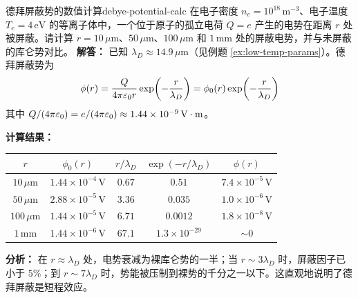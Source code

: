 \begin{example}{德拜屏蔽势的数值计算}{debye-potential-calc}
在电子密度 $n_e=10^{18}\,\mathrm{m}^{-3}$、电子温度 $T_e=4\,\mathrm{eV}$ 的等离子体中，一个位于原子的孤立电荷 $Q=e$ 产生的电势在距离 $r$ 处被屏蔽。请计算 $r=10\,\mu\mathrm{m}$、$50\,\mu\mathrm{m}$、$100\,\mu\mathrm{m}$ 和 $1\,\mathrm{mm}$ 处的屏蔽电势，并与未屏蔽的库仑势对比。
\tcblower
\textbf{解答：}
已知 $\lambda_D\approx 14.9\,\mu\mathrm{m}$（见例题 \ref{ex:low-temp-params}）。德拜屏蔽势为
\[
\phi(r) = \frac{Q}{4\pi\varepsilon_0 r}\exp\!\left(-\frac{r}{\lambda_D}\right) = \phi_0(r)\exp\!\left(-\frac{r}{\lambda_D}\right)
\]
其中 $Q/(4\pi\varepsilon_0)=e/(4\pi\varepsilon_0)\approx 1.44\times 10^{-9}\,\mathrm{V\cdot m}$。

\textbf{计算结果：}
\begin{center}
\begin{tabular}{ccccc}
\hline
$r$ & $\phi_0(r)$ & $r/\lambda_D$ & $\exp(-r/\lambda_D)$ & $\phi(r)$ \\
\hline
$10\,\mu\mathrm{m}$ & $1.44\times 10^{-4}\,\mathrm{V}$ & $0.67$ & $0.51$ & $7.4\times 10^{-5}\,\mathrm{V}$ \\
$50\,\mu\mathrm{m}$ & $2.88\times 10^{-5}\,\mathrm{V}$ & $3.36$ & $0.035$ & $1.0\times 10^{-6}\,\mathrm{V}$ \\
$100\,\mu\mathrm{m}$ & $1.44\times 10^{-5}\,\mathrm{V}$ & $6.71$ & $0.0012$ & $1.8\times 10^{-8}\,\mathrm{V}$ \\
$1\,\mathrm{mm}$ & $1.44\times 10^{-6}\,\mathrm{V}$ & $67.1$ & $1.3\times 10^{-29}$ & $\sim 0$ \\
\hline
\end{tabular}
\end{center}

\textbf{分析：} 在 $r\approx\lambda_D$ 处，电势衰减为裸库仑势的一半；当 $r\sim 3\lambda_D$ 时，屏蔽因子已小于 $5\%$；到 $r\sim 7\lambda_D$ 时，势能被压制到裸势的千分之一以下。这直观地说明了德拜屏蔽是短程效应。
\end{example}

